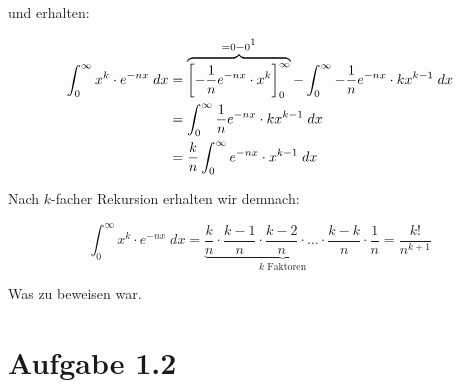 \documentclass[a4paper,german,12pt,smallheadings]{scrartcl}
\begin{document}
und erhalten:

\begin{align*}
  \int_0^\infty x^k \cdot e^{-nx} \; dx  &= \overbrace{\left[-\frac{1}{n} e^{-nx} \cdot x^k\right]_0^\infty}^{=0-0\footnotemark[1]} - \int_0^\infty -\frac{1}{n}e^{-nx} \cdot kx^{k-1} \; dx \\
                                         &= \int_0^\infty \frac{1}{n}e^{-nx} \cdot kx^{k-1} \; dx \\
                                         &= \frac{k}{n} \int_0^\infty e^{-nx} \cdot x^{k-1} \; dx
\end{align*}


Nach $k$-facher Rekursion erhalten wir demnach:

\begin{equation*}
  \int_0^\infty x^k \cdot e^{-nx} \; dx = \underbrace{\frac{k}{n} \cdot \frac{k-1}{n} \cdot \frac{k-2}{n} \cdot \dots \cdot \frac{k-k}{n}}_{k\text{ Faktoren}} \cdot \frac{1}{n} = \frac{k!}{n^{k+1}}
\end{equation*}

Was zu beweisen war.


\section*{Aufgabe 1.2}
\end{document}
